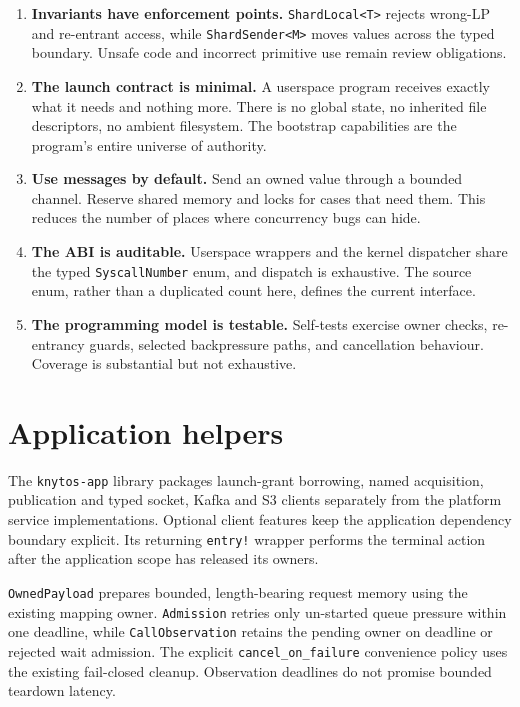 \begin{enumerate}
    \item \textbf{Invariants have enforcement points.} \texttt{ShardLocal<T>}
        rejects wrong-LP and re-entrant access, while \texttt{ShardSender<M>} moves
        values across the typed boundary. Unsafe code and incorrect primitive use
        remain review obligations.

    \item \textbf{The launch contract is minimal.} A userspace program receives
        exactly what it needs and nothing more. There is no global state, no
        inherited file descriptors, no ambient filesystem. The bootstrap
        capabilities are the program's entire universe of authority.

    \item \textbf{Use messages by default.} Send an owned value through a bounded
        channel. Reserve shared memory and locks for cases that need them. This reduces
        the number of places where concurrency bugs can hide.

    \item \textbf{The ABI is auditable.} Userspace wrappers and the kernel
        dispatcher share the typed \texttt{SyscallNumber} enum, and dispatch is
        exhaustive. The source enum, rather than a duplicated count here, defines
        the current interface.

    \item \textbf{The programming model is testable.} Self-tests exercise
        owner checks, re-entrancy guards, selected backpressure paths, and
        cancellation behaviour. Coverage is substantial but not exhaustive.
\end{enumerate}

\section{Application helpers}

The \texttt{knytos-app} library packages launch-grant borrowing, named
acquisition, publication and typed socket, Kafka and S3 clients separately
from the platform service implementations. Optional client features keep the
application dependency boundary explicit. Its returning \texttt{entry!}
wrapper performs the terminal action after the application scope has released
its owners.

\texttt{OwnedPayload} prepares bounded, length-bearing request memory using
the existing mapping owner. \texttt{Admission} retries only un-started queue
pressure within one deadline, while \texttt{CallObservation} retains the pending
owner on deadline or rejected wait admission. The explicit
\texttt{cancel\_on\_failure} convenience policy uses the existing fail-closed
cleanup. Observation deadlines do not promise bounded teardown latency.

